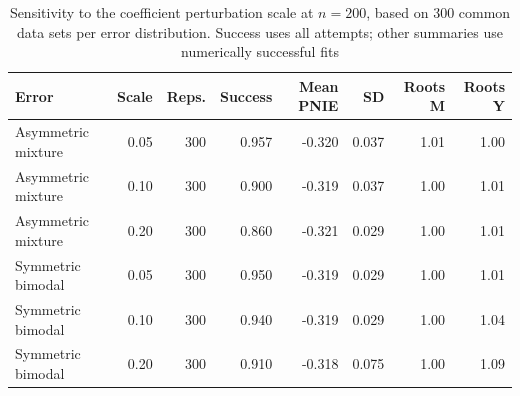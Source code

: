 \begin{table}[htbp]
\centering
\caption{Sensitivity to the coefficient perturbation scale at $n=200$, based on 300 common data sets per error distribution. Success uses all attempts; other summaries use numerically successful fits}
\label{tab:algorithm_sensitivity}
\small
\begin{tabular}{lrrrrrrr}
\toprule
Error & Scale & Reps. & Success & Mean PNIE & SD & Roots M & Roots Y \\
\midrule
Asymmetric mixture & 0.05 & 300 & 0.957 & -0.320 & 0.037 & 1.01 & 1.00 \\
Asymmetric mixture & 0.10 & 300 & 0.900 & -0.319 & 0.037 & 1.00 & 1.01 \\
Asymmetric mixture & 0.20 & 300 & 0.860 & -0.321 & 0.029 & 1.00 & 1.01 \\
Symmetric bimodal & 0.05 & 300 & 0.950 & -0.319 & 0.029 & 1.00 & 1.01 \\
Symmetric bimodal & 0.10 & 300 & 0.940 & -0.319 & 0.029 & 1.00 & 1.04 \\
Symmetric bimodal & 0.20 & 300 & 0.910 & -0.318 & 0.075 & 1.00 & 1.09 \\
\bottomrule
\end{tabular}
\end{table}
